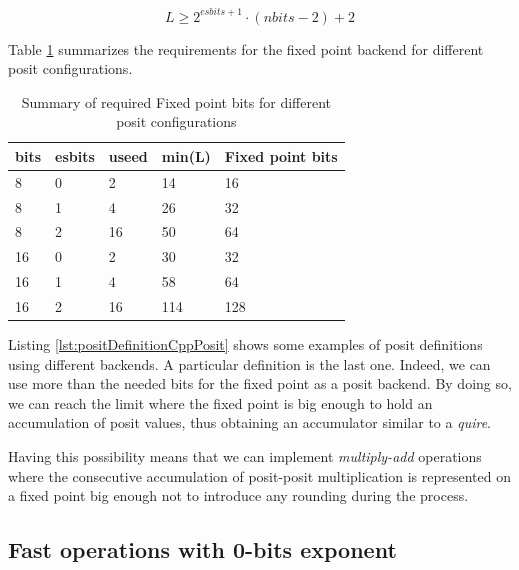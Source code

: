 \begin{equation}
    L \geq 2^{esbits + 1} \cdot (nbits - 2) + 2
\end{equation}

Table \ref{tab:fixedPointToPositSize} summarizes the requirements for the fixed point backend for different posit configurations.

\begin{table}[]
\centering
\caption{Summary of required Fixed point bits for different posit configurations}
\label{tab:fixedPointToPositSize}
\begin{tabular}{lllll}

bits & esbits & useed & min(L) & Fixed point bits \\ \hline
8    & 0      & 2     & 14     & 16               \\
8    & 1      & 4     & 26     & 32               \\
8    & 2      & 16    & 50     & 64               \\
16   & 0      & 2     & 30     & 32               \\
16   & 1      & 4     & 58     & 64               \\
16   & 2      & 16    & 114    & 128              \\ \hline
\end{tabular}
\end{table}

Listing \ref{lst:positDefinitionCppPosit} shows some examples of posit definitions using different backends. A particular definition is the last one. Indeed, we can use more than the needed bits for the fixed point as a posit backend. By doing so, we can reach the limit where the fixed point is big enough to hold an accumulation of posit values, thus obtaining an accumulator similar to a \textit{quire}.

Having this possibility means that we can implement \textit{multiply-add} operations where the consecutive accumulation of posit-posit multiplication is represented on a fixed point big enough not to introduce any rounding during the process.  





\subsection{Fast operations with 0-bits exponent}

